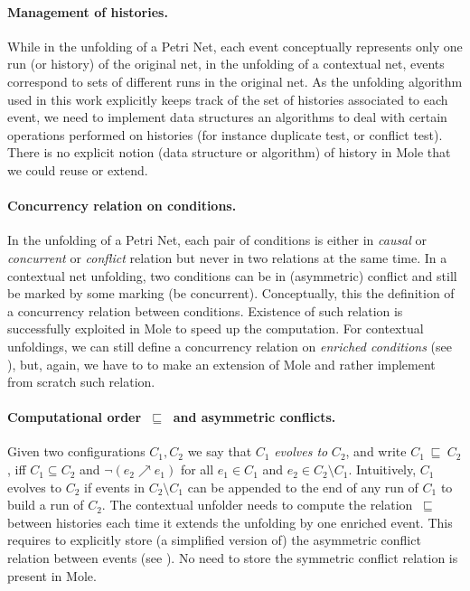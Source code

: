 \documentclass[11pt,a4paper]{article}
\newcommand{\evolves}{{\ensuremath{\ \sqsubseteq \ }}}
\begin{document}
\paragraph{Management of histories.}  While in the unfolding of a Petri Net,
each event conceptually represents only one run (or history) of the original
net, in the unfolding of a contextual net, events correspond to sets of
different runs in the original net.  As the unfolding algorithm used in this
work explicitly keeps track of the set of histories associated to each event,
we need to implement data structures an algorithms to deal with certain
operations performed on histories (for instance duplicate test, or conflict
test).  There is no explicit notion (data structure or algorithm) of history in
Mole that we could reuse or extend.

\paragraph{Concurrency relation on conditions.}  In the unfolding of a Petri
Net, each pair of conditions is either in \emph{causal} or \emph{concurrent} or
\emph{conflict} relation  but never in two relations at the
same time.  In a contextual net unfolding, two conditions can be in
(asymmetric) conflict and still be marked by some marking (be concurrent).
Conceptually, this  the definition of a concurrency
relation between conditions.  Existence of such relation is successfully
exploited in Mole to speed up the computation.  For contextual unfoldings, we
can still define a concurrency relation on \emph{enriched conditions} (see
), but, again, we have to  to make an extension
of Mole and rather implement from scratch such relation.

\paragraph{Computational order $\evolves$ and asymmetric conflicts.} Given two
configurations $C_1, C_2$ we say that $C_1$ \emph{evolves to} $C_2$, and write
$C_1 \evolves C_2$, iff $C_1 \subseteq C_2$ and $\lnot (e_2 \nearrow e_1)$ for
all $e_1 \in C_1$ and $e_2 \in C_2 \setminus C_1$.  Intuitively, $C_1$ evolves
to $C_2$ if events in $C_2 \setminus C_1$ can be appended to the end of any
run of $C_1$ to build a run of $C_2$.  The contextual unfolder needs to compute
the relation $\evolves$ between histories each time it extends the unfolding by
one enriched event.  This requires to explicitly store (a simplified version
of) the asymmetric conflict relation between events (see ).  No
need to store the symmetric conflict relation is present in Mole.
\end{document}
